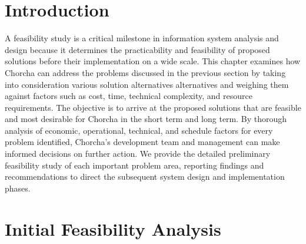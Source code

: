 \documentclass[12pt,a4paper,oneside]{book}
\begin{document}
\section{Introduction}
\begin{tcolorbox}[infobox, title=Feasibility Study Purpose]
A feasibility study is a critical milestone in information system analysis and design because it determines the practicability and feasibility of proposed solutions before their implementation on a wide scale. This chapter examines how Chorcha can address the problems discussed in the previous section by taking into consideration various solution alternatives alternatives and weighing them against factors such as cost, time, technical complexity, and resource requirements. The objective is to arrive at the proposed solutions that are feasible and most desirable for Chorcha in the short term and long term. By thorough analysis of economic, operational, technical, and schedule factors for every problem identified, Chorcha's development team and management can make informed decisions on further action. We provide the detailed preliminary feasibility study of each important problem area, reporting findings and recommendations to direct the subsequent system design and implementation phases.
\end{tcolorbox}

\section{Initial Feasibility Analysis}
\end{document}
